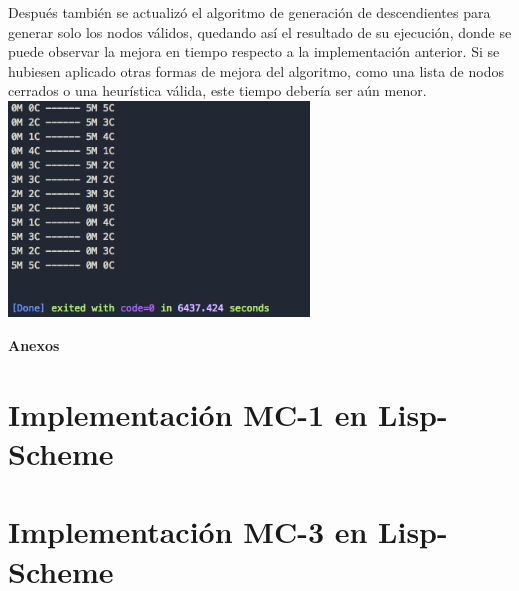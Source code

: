 \documentclass{article}
\begin{document}
Después también se actualizó el algoritmo de generación de descendientes para generar solo los nodos válidos, quedando así el resultado de su ejecución, donde se puede observar la mejora en tiempo respecto a la implementación anterior. Si se hubiesen aplicado otras formas de mejora del algoritmo, como una lista de nodos cerrados o una heurística válida, este tiempo debería ser aún menor. \\
\includegraphics[width=8cm]{resources/mc-3v2} \\




\pagebreak
\appendix
{}
\noindent\textbf{\huge Anexos}



\section{Implementación MC-1 en Lisp-Scheme}


\pagebreak
\section{Implementación MC-3 en Lisp-Scheme}

\end{document}
